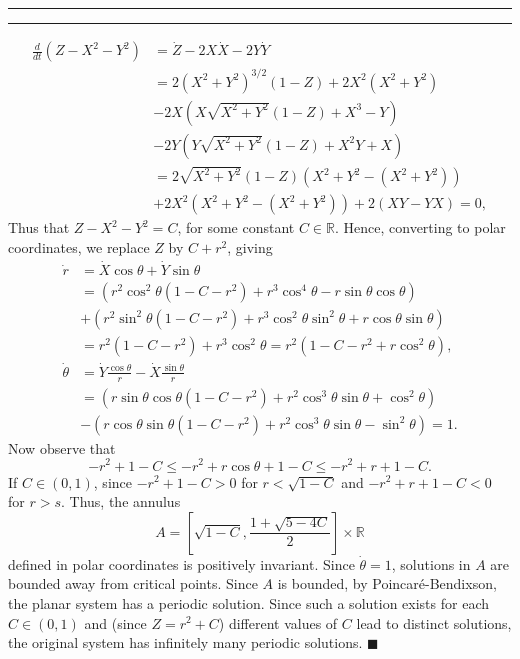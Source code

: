 \documentclass[11pt]{article}
\newcounter{questionCounter}
\newcounter{partCounter}[questionCounter]
\newenvironment{question}[2][\arabic{questionCounter}]{%
    \setcounter{partCounter}{0}%
    \vspace{.25in} \hrule \vspace{0.5em}%
        \noindent{\bf #2}%
    \vspace{0.8em} \hrule \vspace{.10in}%
    \addtocounter{questionCounter}{1}%
}{}
\renewcommand{\qed}{\quad $\blacksquare$}
\newcommand{\R}{\mathbb{R}} %
\begin{document}
\begin{question}{Problem 4}
\begin{align*}
\frac{d}{dt}\left( Z - X^2 - Y^2 \right)
 & = \dot Z - 2X \dot X - 2Y \dot Y                             \\
 & = 2(X^2 + Y^2)^{3/2}(1 - Z) + 2X^2 \left( X^2 + Y^2 \right)  \\
 & - 2X\left(X\sqrt{X^2 + Y^2}(1 - Z) + X^3 - Y\right)          \\
 & - 2Y\left(Y\sqrt{X^2 + Y^2}(1 - Z) + X^2Y + X\right)         \\
 & = 2\sqrt{X^2 + Y^2}(1 - Z)(X^2 + Y^2 - (X^2 + Y^2))          \\
 & + 2X^2(X^2 + Y^2 - (X^2 + Y^2))
   + 2(XY - YX)
   = 0,
\end{align*}
Thus that $Z - X^2 - Y^2 = C$, for some constant $C \in \R$. Hence,
converting to polar coordinates, we replace $Z$ by $C + r^2$, giving
\begin{align*}
\dot r
 & = \dot X \cos\theta + \dot Y \sin\theta   \\
 & = \left( r^2\cos^2\theta(1 - C - r^2)
        + r^3\cos^4\theta - r\sin\theta\cos\theta \right)    \\
 & + \left( r^2\sin^2\theta(1 - C - r^2)
        + r^3\cos^2\theta\sin^2\theta + r\cos\theta\sin\theta \right)   \\
 & = r^2(1 - C - r^2) + r^3\cos^2\theta
   = r^2(1 - C - r^2 + r\cos^2\theta),    \\
\dot \theta
 & = \dot Y \frac{\cos\theta}{r} - \dot X \frac{\sin\theta}{r}  \\
 & = \left( r\sin\theta\cos\theta(1 - C - r^2)
        + r^2\cos^3\theta\sin\theta + \cos^2\theta \right)  \\
 & - \left( r\cos\theta\sin\theta(1 - C - r^2)
        + r^2\cos^3\theta\sin\theta - \sin^2\theta \right)
   = 1.
\end{align*}
Now observe that
\[-r^2 + 1 - C
    \leq -r^2 + r\cos\theta + 1 - C
    \leq -r^2 + r + 1 - C.
\]
If $C \in (0,1)$, since $-r^2 + 1 - C > 0$ for $r < \sqrt{1 - C}$ and
$-r^2 + r + 1 - C < 0$ for $r > s$. Thus, the annulus
\[A
    = \left[ \sqrt{1 - C}, \frac{1 + \sqrt{5 - 4C}}{2} \right] \times \R
\]
defined in polar coordinates is positively invariant. Since
$\dot \theta = 1$, solutions in $A$ are bounded away from critical points.
Since $A$ is bounded, by Poincar\'e-Bendixson, the planar system has a periodic
solution. Since such a solution exists for each $C \in (0,1)$ and (since
$Z = r^2 + C$) different values of $C$ lead to distinct solutions, the original
system has infinitely many periodic solutions. \qed
\end{question}
\end{document}
